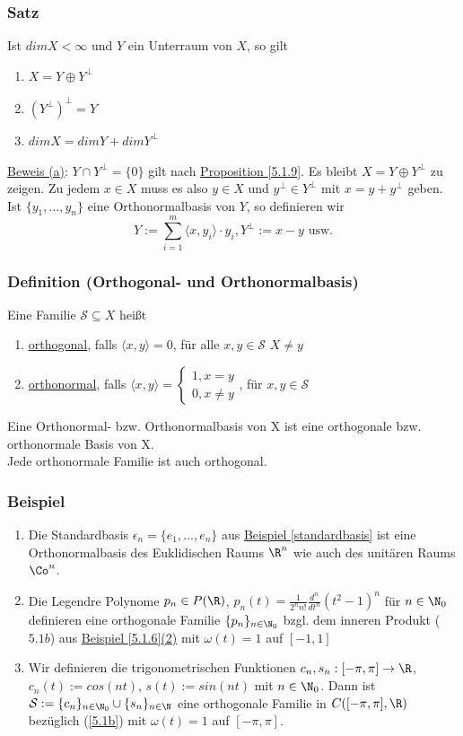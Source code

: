 \subsubsection{Satz}
Ist $dimX<\infty$ und $Y$ ein Unterraum von $X$, so gilt
\alphabet
\begin{enumerate}
\item $X=Y\oplus Y^{\bot}$
\item $(Y^{\bot})^{\bot}=Y$
\item $dimX=dimY+dimY^{\bot}$
\end{enumerate}
\underline{Beweis (a)}: $Y\cap Y^{\bot}=\{0\}$ gilt nach \hyperref[5.1.9]{Proposition \ref*{5.1.9}}. Es bleibt $X=Y\oplus Y^{\bot}$ zu zeigen. Zu jedem $x\in X$ muss es also $y\in X$ und $y^{\bot}\in Y^{\bot}$ mit $x=y+y^{\bot}$ geben. Ist $\{y_1, \dots,y_n\}$ eine Orthonormalbasis von $Y$, so definieren wir
\[Y:=\sum_{i=1}^m \langle x,y_i\rangle \cdot y_i, Y^{\bot}:=x-y\text{ usw.}\]
\subsubsection{Definition (Orthogonal- und Orthonormalbasis)}
Eine Familie $\mathcal{S} \subseteq X$ heißt
\alphabet
\begin{enumerate}
\item \underline{orthogonal}, falls $\langle x,y\rangle=0$, für alle $x,y\in \mathcal{S}$ $X\neq y$
\item \underline{orthonormal}, falls $\langle x,y\rangle=\begin{cases}1,x=y\\0,x\neq y\end{cases}$, für $x,y\in \mathcal{S}$
\end{enumerate}
Eine Orthonormal- bzw. Orthonormalbasis von X ist eine orthogonale bzw. orthonormale Basis von X.\\
Jede orthonormale Familie ist auch orthogonal.
\subsubsection{Beispiel}
\numbers
\begin{enumerate}
\item Die Standardbasis $\epsilon_n=\{e_1,\dots,e_n\}$ aus \hyperref[standardbasis]{Beispiel \ref*{standardbasis}} ist eine Orthonormalbasis des Euklidischen Raums $\R^n$ wie auch des unitären Raums $\Co^n$.
\item Die Legendre Polynome $p_n\in P(\R)$, $p_n(t)=\frac{1}{2^n n!} \frac{d^n}{dt^n} (t^2-1)^n$ für $n\in\N_0$ definieren eine orthogonale Familie $\{p_n\}_{n\in\N_0}$ bzgl. dem inneren Produkt (\hyperref[5.1b]{$5.1b$}) aus \hyperref[5.1.6]{Beispiel \ref{5.1.6}(2)} mit $\omega(t)=1$ auf $[-1,1]$
\item Wir definieren die trigonometrischen Funktionen $c_n,s_n:[-\pi,\pi]\rightarrow\R$, $c_n(t):=cos(nt)$, $s(t):=sin(nt)$ mit $n\in\N_0$. Dann ist $\mathcal{S}:=\{c_n\}_{n\in\N_0} \cup \{s_n\}_{n\in\N}$ eine orthogonale Familie in $C([-\pi,\pi],\R)$ bezüglich (\ref{5.1b}) mit $\omega(t)=1$ auf $[-\pi,\pi]$.
\end{enumerate}
